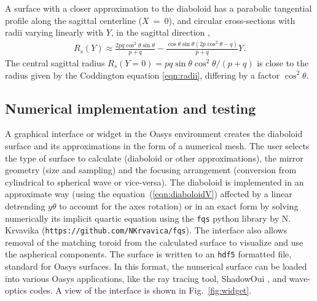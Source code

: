 \documentclass[preprint]{iucr}       %
\begin{document}


A surface with a closer approximation to the diaboloid has a parabolic tangential profile along the sagittal centerline ($X$~=~0), and circular cross-sections with radii varying linearly with $Y$, in the sagittal direction \cite{val2021},
\begin{multline}
\label{eq:sagRadius}
R_s(Y) 
\approx 
\frac{2p q \cos^2\theta \sin\theta }{p + q} - 
\frac{\cos\theta \sin\theta (2 p \cos^2\theta - q)}{p + q} Y.
\end{multline}
The central sagittal radius $R_s(Y=0)=p q \sin\theta \cos^2\theta/ (p+q)$ is close to the radius given by the Coddington equation \ref{eqn:radii}, differing by a factor $\cos^2\theta$.


\subsection{Numerical implementation and testing}
\label{sec:oasys}

A graphical interface or widget in the Oasys environment creates the diaboloid surface and its approximations in the form of a numerical mesh. The user selects the type of surface to calculate (diaboloid or other approximations), the mirror geometry (size and sampling) and the focusing arrangement (conversion from cylindrical to spherical wave or vice-versa). 
The diaboloid is implemented in an approximate way (using the equation~(\ref{eqn:diaboloidV}) affected by a linear detrending $y\theta$ to account for the axes rotation) or in an exact form by solving numerically its implicit quartic equation \cite{val2021} using the {\tt fqs} python library by N. Krvavika ({\tt https://github.com/NKrvavica/fqs}). 
The interface also allows removal of the matching toroid from the calculated surface to visualize and use the aspherical components. The surface is written to an {\tt hdf5} formatted file, standard for Oasys surfaces. In this format, the numerical surface can be loaded into various Oasys applications, like the ray tracing tool, ShadowOui \cite{codeSHADOWOUI}, and wave-optics codes. A view of the interface is shown in Fig.~\ref{fig:widget}.
\end{document}
